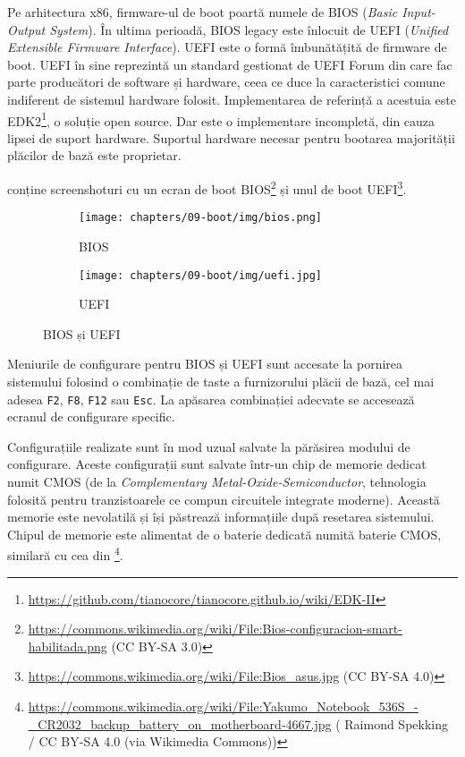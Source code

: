 Pe arhitectura x86, firmware-ul de boot poartă numele de BIOS (\textit{Basic Input-Output System}).
În ultima perioadă, BIOS legacy este înlocuit de UEFI (\textit{Unified Extensible Firmware Interface}).
UEFI este o formă îmbunătățită de firmware de boot.
UEFI în sine reprezintă un standard gestionat de UEFI Forum din care fac parte producători de software și hardware, ceea ce duce la caracteristici comune indiferent de sistemul hardware folosit.
Implementarea de referință a acestuia este EDK2\footnote{\url{https://github.com/tianocore/tianocore.github.io/wiki/EDK-II}}, o soluție open source.
Dar este o implementare incompletă, din cauza lipsei de suport hardware.
Suportul hardware necesar pentru bootarea majorității plăcilor de bază este proprietar.

 conține screenshoturi cu un ecran de boot BIOS\footnote{\url{https://commons.wikimedia.org/wiki/File:Bios-configuracion-smart-habilitada.png} (CC BY-SA 3.0)} și unul de boot UEFI\footnote{\url{https://commons.wikimedia.org/wiki/File:Bios\_asus.jpg} (CC BY-SA 4.0)}.

\begin{figure}[!htbp]
  \centering
  \begin{subfigure}[b]{0.8\textwidth}
    \texttt{[image: chapters/09-boot/img/bios.png]}
    \caption{BIOS}
    \label{fig:intro:bios}
  \end{subfigure}

  \begin{subfigure}[b]{0.8\textwidth}
    \texttt{[image: chapters/09-boot/img/uefi.jpg]}
    \caption{UEFI}
    \label{fig:boot:uefi}
  \end{subfigure}
  \caption{BIOS și UEFI}
  \label{fig:boot:bios-uefi}
\end{figure}

Meniurile de configurare pentru BIOS și UEFI sunt accesate la pornirea sistemului folosind o combinație de taste a furnizorului plăcii de bază, cel mai adesea \texttt{F2}, \texttt{F8}, \texttt{F12} sau \texttt{Esc}.
La apăsarea combinației adecvate se accesează ecranul de configurare specific.

Configurațiile realizate sunt în mod uzual salvate la părăsirea modului de configurare.
Aceste configurații sunt salvate într-un chip de memorie dedicat numit CMOS  (de la \textit{Complementary Metal-Oxide-Semiconductor}, tehnologia folosită pentru tranzistoarele ce compun circuitele integrate moderne).
Această memorie este nevolatilă și își păstrează informațiile după resetarea sistemului.
Chipul de memorie este alimentat de o baterie dedicată numită baterie CMOS, similară cu cea din \footnote{\url{https://commons.wikimedia.org/wiki/File:Yakumo\_Notebook\_536S\_-\_CR2032\_backup\_battery\_on\_motherboard-4667.jpg} (\textcopyright{} Raimond Spekking / CC BY-SA 4.0 (via Wikimedia Commons))}.

